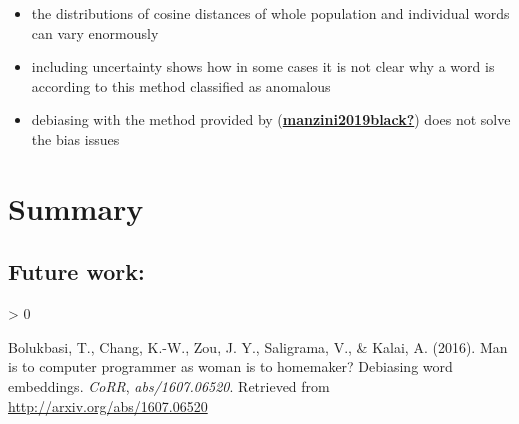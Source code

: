 \documentclass[
  12pt,
]{book}
\providecommand{\tightlist}{%
  \setlength{\itemsep}{0pt}\setlength{\parskip}{0pt}}
\newlength{\cslhangindent}
\newenvironment{CSLReferences}[2] %
 {%
  \setlength{\parindent}{0pt}
  \ifodd #1 \everypar{\setlength{\hangindent}{\cslhangindent}}\ignorespaces\fi
  \ifnum #2 > 0
  \setlength{\parskip}{#2\baselineskip}
  \fi
 }%
 {}
\begin{document}
\begin{itemize}
\tightlist
\item
  the distributions of cosine distances of whole population and individual words can vary enormously
\item
  including uncertainty shows how in some cases it is not clear why a word is according to this method
  classified as anomalous
\item
  debiasing with the method provided by (\protect\hyperlink{ref-manzini2019black}{\textbf{manzini2019black?}}) does not solve the bias issues
\end{itemize}

\hypertarget{summary}{%
\chapter{Summary}\label{summary}}

\hypertarget{future-work}{%
\section{Future work:}\label{future-work}}

\hypertarget{refs}{}
\begin{CSLReferences}{1}{0}
\leavevmode\hypertarget{ref-Bolukbasi2016Man}{}%
Bolukbasi, T., Chang, K.-W., Zou, J. Y., Saligrama, V., \& Kalai, A. (2016). Man is to computer programmer as woman is to homemaker? Debiasing word embeddings. \emph{CoRR}, \emph{abs/1607.06520}. Retrieved from \url{http://arxiv.org/abs/1607.06520}

\end{CSLReferences}
\end{document}
